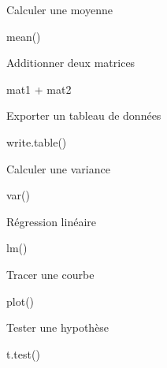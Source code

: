 \documentclass[
]{book}
\newenvironment{Shaded}{\begin{snugshade}}{\end{snugshade}}
\newcommand{\FunctionTok}[1]{\textcolor[rgb]{0.00,0.00,0.00}{#1}}
\newcommand{\NormalTok}[1]{#1}
\newcommand{\SpecialCharTok}[1]{\textcolor[rgb]{0.00,0.00,0.00}{#1}}
\begin{document}
Calculer une moyenne

\begin{Shaded}
\begin{Highlighting}[]
\FunctionTok{mean}\NormalTok{()}
\end{Highlighting}
\end{Shaded}

Additionner deux matrices

\begin{Shaded}
\begin{Highlighting}[]
\NormalTok{mat1 }\SpecialCharTok{+}\NormalTok{ mat2}
\end{Highlighting}
\end{Shaded}

Exporter un tableau de données

\begin{Shaded}
\begin{Highlighting}[]
\FunctionTok{write.table}\NormalTok{()}
\end{Highlighting}
\end{Shaded}

Calculer une variance

\begin{Shaded}
\begin{Highlighting}[]
\FunctionTok{var}\NormalTok{()}
\end{Highlighting}
\end{Shaded}

Régression linéaire

\begin{Shaded}
\begin{Highlighting}[]
\FunctionTok{lm}\NormalTok{()}
\end{Highlighting}
\end{Shaded}

Tracer une courbe

\begin{Shaded}
\begin{Highlighting}[]
\FunctionTok{plot}\NormalTok{()}
\end{Highlighting}
\end{Shaded}

Tester une hypothèse

\begin{Shaded}
\begin{Highlighting}[]
\FunctionTok{t.test}\NormalTok{()}
\end{Highlighting}
\end{Shaded}
\end{document}
